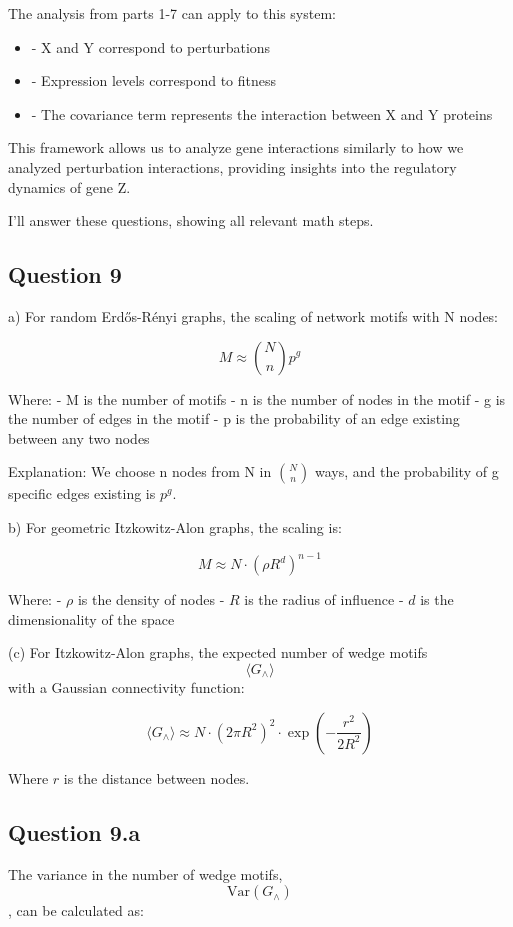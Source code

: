\documentclass{article}
\begin{document}
The analysis from parts 1-7 can apply to this system:
\begin{itemize}
    \item - X and Y correspond to perturbations
    \item - Expression levels correspond to fitness
    \item - The covariance term represents the interaction between X and Y proteins
\end{itemize}

This framework allows us to analyze gene interactions similarly to how we analyzed perturbation interactions, providing insights into the regulatory dynamics of gene Z.

I'll answer these questions, showing all relevant math steps.

\subsection{Question 9}

a) For random Erdős-Rényi graphs, the scaling of network motifs with N nodes:

$$M \approx \binom{N}{n} p^g$$

Where:
- M is the number of motifs
- n is the number of nodes in the motif
- g is the number of edges in the motif
- p is the probability of an edge existing between any two nodes

Explanation: We choose n nodes from N in $\binom{N}{n}$ ways, and the probability of g specific edges existing is $p^g$.

b) For geometric Itzkowitz-Alon graphs, the scaling is:

$$M \approx N \cdot (\rho R^d)^{n-1}$$

Where:
- $\rho$ is the density of nodes
- $R$ is the radius of influence
- $d$ is the dimensionality of the space

(c) For Itzkowitz-Alon graphs, the expected number of wedge motifs \[ \langle G_{\wedge} \rangle \] with a Gaussian connectivity function:

\[
\langle G_{\wedge} \rangle \approx N \cdot (2\pi R^2)^2 \cdot \exp\left(-\frac{r^2}{2R^2}\right)
\]

Where \( r \) is the distance between nodes.

\subsection{Question 9.a}

The variance in the number of wedge motifs, \[\text{Var}(G_{\wedge})\], can be calculated as:
\end{document}
